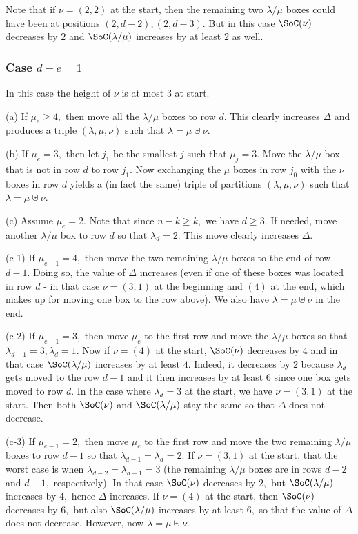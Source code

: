\documentclass[12pt,dvipsnames,accepted=2016-08-18,a4paper,onecolumn]{quantumarticle}
\def\la{\lambda}
\def\la{\lambda}
\numberwithin{equation}{section}
\theoremstyle{definition}
\begin{document}
Note that if $\nu=(2,2)$ at the start, then the remaining two $\la/\mu$ boxes could have been at positions $(2,d-2),(2,d-3).$ But in this case  $\SoC(\nu)$ decreases by  $2$ and $\SoC(\la/\mu)$ increases by at least $2$ as well.


\subsubsection{Case $d-e=1$}
In this case the height of $\nu$ is at most $3$ at  start.

(a) If $\mu_e \geq 4,$ then move all the $\la/\mu$ boxes to row $d.$ This clearly increases $\Delta$ and produces a triple $(\la,\mu,\nu)$ such that $\la = \mu \uplus \nu$. 

(b) If $\mu_e = 3,$ then let $j_1$ be the smallest $j$ such that $\mu_j=3.$ Move the $\la/\mu$ box that is not in row $d$ to row $j_1.$ Now exchanging the $\mu$ boxes in row $j_0$ with the $\nu$ boxes in row $d$ yields a (in fact the same) triple of partitions $(\la,\mu,\nu)$ such that $\la = \mu \uplus \nu$. 

(c) Assume $\mu_e=2.$ Note that since $n-k\geq k,$ we have $d\geq 3.$ If needed, move another $\la / \mu$ box to row $d$ so that $\la_d=2.$ This move clearly increases $\Delta.$ 

(c-1) If $\mu_{e-1}=4,$ then move the two remaining $\la/\mu$ boxes to the end of row $d-1.$ Doing so, the value of $\Delta$ increases (even if one of these boxes was located in row $d$ - in that case $\nu = (3,1)$ at the beginning and $(4)$ at the end, which makes up for moving one box to the row above). We also have  $\la = \mu \uplus \nu$ in the end.

(c-2) If $\mu_{e-1} = 3,$ then move $\mu_{e}$ to the first row and move the $\la/\mu$ boxes so that $\la_{d-1}=3,\la_d=1.$ Now if  $\nu=(4)$ at the start, $\SoC(\nu)$ decreases by $4$ and in that case $\SoC(\la/\mu)$ increases by at least $4.$ Indeed, it decreases by $2$ because $\la_d$ gets moved to the row $d-1$ and it then increases by at least $6$ since one box gets moved to row $d$.
In the case where $\la_d=3$ at the start, we have $\nu=(3,1)$ at the start. Then both $\SoC(\nu)$  and $\SoC(\la/\mu)$ stay the same so that $\Delta$ does not decrease.

(c-3) If $\mu_{e-1} = 2,$ then move $\mu_e$ to the first row and move the two remaining $\la/\mu$ boxes to row $d-1$ so that $\la_{d-1}=\la_d=2.$
If $\nu=(3,1)$ at the start, that the worst case is when $\la_{d-2}=\la_{d-1}=3$ (the remaining $\la/\mu$ boxes are in rows $d-2$ and $d-1,$ respectively). In that case $\SoC(\nu)$ decreases by $2,$ but $\SoC(\la/\mu)$ increases by $4,$ hence $\Delta$ increases.
If $\nu=(4)$ at the start, then  $\SoC(\nu)$ decreases by $6,$ but also $\SoC(\la/\mu)$ increases by at least $6,$ so that the value of $\Delta$ does not decrease. However, now $\la = \mu \uplus \nu$. 
\end{document}
